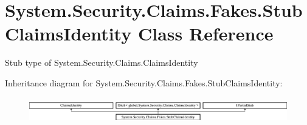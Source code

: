\hypertarget{class_system_1_1_security_1_1_claims_1_1_fakes_1_1_stub_claims_identity}{\section{System.\-Security.\-Claims.\-Fakes.\-Stub\-Claims\-Identity Class Reference}
\label{class_system_1_1_security_1_1_claims_1_1_fakes_1_1_stub_claims_identity}
}


Stub type of System.\-Security.\-Claims.\-Claims\-Identity 


Inheritance diagram for System.\-Security.\-Claims.\-Fakes.\-Stub\-Claims\-Identity\-:\begin{figure}[H]
\begin{center}
\leavevmode
\includegraphics[height=1.155831cm]{class_system_1_1_security_1_1_claims_1_1_fakes_1_1_stub_claims_identity}
\end{center}
\end{figure}
